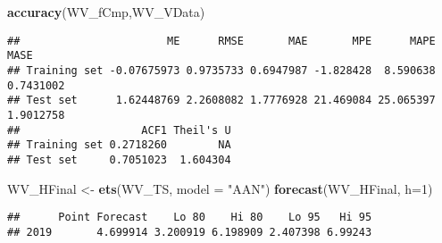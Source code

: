 \documentclass[
]{article}
\newenvironment{Shaded}{\begin{snugshade}}{\end{snugshade}}
\newcommand{\CommentTok}[1]{\textcolor[rgb]{0.56,0.35,0.01}{\textit{#1}}}
\newcommand{\DataTypeTok}[1]{\textcolor[rgb]{0.13,0.29,0.53}{#1}}
\newcommand{\DecValTok}[1]{\textcolor[rgb]{0.00,0.00,0.81}{#1}}
\newcommand{\KeywordTok}[1]{\textcolor[rgb]{0.13,0.29,0.53}{\textbf{#1}}}
\newcommand{\NormalTok}[1]{#1}
\newcommand{\OperatorTok}[1]{\textcolor[rgb]{0.81,0.36,0.00}{\textbf{#1}}}
\newcommand{\StringTok}[1]{\textcolor[rgb]{0.31,0.60,0.02}{#1}}
\begin{document}
\begin{Shaded}
\begin{Highlighting}[]
\KeywordTok{accuracy}\NormalTok{(WV_fCmp,WV_VData)}
\end{Highlighting}
\end{Shaded}

\begin{verbatim}
##                       ME      RMSE       MAE       MPE      MAPE      MASE
## Training set -0.07675973 0.9735733 0.6947987 -1.828428  8.590638 0.7431002
## Test set      1.62448769 2.2608082 1.7776928 21.469084 25.065397 1.9012758
##                   ACF1 Theil's U
## Training set 0.2718260        NA
## Test set     0.7051023  1.604304
\end{verbatim}

\begin{Shaded}
\begin{Highlighting}[]
\NormalTok{WV_HFinal <-}\StringTok{ }\KeywordTok{ets}\NormalTok{(WV_TS, }\DataTypeTok{model =} \StringTok{"AAN"}\NormalTok{)}
\KeywordTok{forecast}\NormalTok{(WV_HFinal, }\DataTypeTok{h=}\DecValTok{1}\NormalTok{)}
\end{Highlighting}
\end{Shaded}

\begin{verbatim}
##      Point Forecast    Lo 80    Hi 80    Lo 95   Hi 95
## 2019       4.699914 3.200919 6.198909 2.407398 6.99243
\end{verbatim}

\begin{Shaded}
\end{Shaded}
\end{document}
